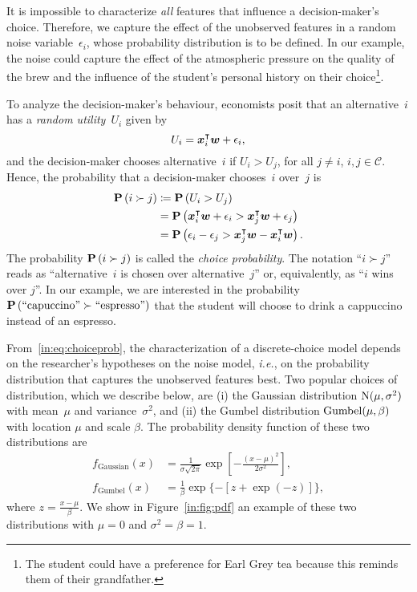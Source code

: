It is impossible to characterize \emph{all} features that influence a decision-maker's choice. %
Therefore, we capture the effect of the unobserved features in a random noise variable~$\epsilon_i$, whose probability distribution is to be defined.
In our example, the noise could capture the effect of the atmospheric pressure on the quality of the brew and the influence of the student's personal history on their choice\footnote{The student could have a preference for Earl Grey tea because this reminds them of their grandfather.}.

To analyze the decision-maker's behaviour, economists posit that an alternative~$i$ has a \emph{random utility}~$U_i$ given by
\begin{equation*}
	U_i = \bm{x}_i^\intercal \bm{w} + \epsilon_i,
\end{equation*}
and the decision-maker chooses alternative~$i$ if $U_i > U_j$, for all $j \neq i$, $i,j \in \mathcal{C}$.
Hence, the probability that a decision-maker chooses~$i$ over~$j$ is
\begin{align}
	\label{in:eq:choiceprob}
	\mathbf{P}\left( i \succ j \right) & \coloneqq \mathbf{P}\left( U_i > U_j \right)                                                  \nonumber \\
	                 & = \mathbf{P}\left( \bm{x}_i^\intercal \bm{w} + \epsilon_i > \bm{x}_j^\intercal \bm{w} + \epsilon_j \right) \nonumber  \\
	                 & = \mathbf{P}\left( \epsilon_i - \epsilon_j > \bm{x}_j^\intercal \bm{w} - \bm{x}_i^\intercal \bm{w} \right).
\end{align}
The probability $\mathbf{P}\left( i \succ j \right)$ is called the \emph{choice probability}.
The notation ``$i \succ j$'' reads as ``alternative~$i$ is chosen over alternative~$j$'' or, equivalently, as ``$i$ wins over $j$''.
In our example, we are interested in the probability $\mathbf{P}\left( \text{``capuccino''} \succ \text{``espresso''} \right)$ that the student will choose to drink a cappuccino instead of an espresso.

From~\eqref{in:eq:choiceprob}, the characterization of a discrete-choice model depends on the researcher's hypotheses on the noise model, \textit{i.e.}, on the probability distribution that captures the unobserved features best.
Two popular choices of distribution, which we describe below, are (i) the Gaussian distribution $\mathrm{N}( \mu, \sigma^2 )$ with mean~$\mu$ and variance~$\sigma^2$, and (ii) the Gumbel distribution $\mathrm{Gumbel}( \mu, \beta )$ with location $\mu$ and scale $\beta$.
The probability density function of these two distributions are
\begin{align*}
	f_{\text{Gaussian}}(x) & = \frac{1}{\sigma \sqrt{2 \pi}} \exp \left[ -\frac{(x - \mu)^2}{2 \sigma^2} \right], \\
	f_{\text{Gumbel}}(x)   & = \frac{1}{\beta} \exp \{ - [z + \exp(-z)]\},
\end{align*}
where  $z = \frac{x - \mu}{\beta}$.
We show in Figure~\ref{in:fig:pdf} an example of these two distributions with $\mu = 0$ and $\sigma^2 = \beta = 1$.

